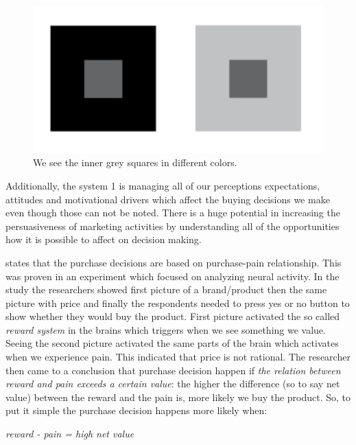 \begin{figure}[ht]
  \begin{center}
    \includegraphics[scale=2, width=\textwidth]{dippa/images/squares.png}
    \caption{We see the inner grey squares in different colors.}
    \label{fig:squares}
  \end{center}
\end{figure}

Additionally, the system 1 is managing all of our perceptions expectations, attitudes and motivational drivers which affect the buying decisions we make even though those can not be noted. There is a huge potential in increasing the persuasiveness of marketing activities by understanding all of the opportunities how it is possible to affect on decision making. \parencite{Decoded:2013}

\textcite{Decoded:2013} states that the purchase decisions are based on purchase-pain relationship. This was proven in an experiment which focused on analyzing neural activity. In the study the researchers showed first picture of a brand/product then the same picture with price and finally the respondents needed to press yes or no button to show whether they would buy the product. First picture activated the so called \emph{reward system} in the brains which triggers when we see something we value. Seeing the second picture activated the same parts of the brain which activates when we experience pain. This indicated that price is not rational. The researcher then came to a conclusion that purchase decision happen if \emph{the relation between reward and pain exceeds a certain value}: the higher the difference (so to say net value) between the reward and the pain is, more likely we buy the product. So, to put it simple the purchase decision happens more likely when:\\
\begin{center}\emph{reward - pain = high net value}\end{center}\\


